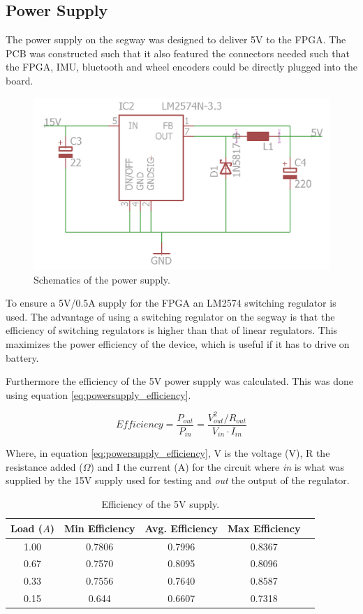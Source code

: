 
\subsection{Power Supply}

The power supply on the segway was designed to deliver 5V to the FPGA.
The PCB was constructed such that it also featured the connectors needed such that the FPGA, IMU, bluetooth and wheel encoders could be directly plugged into the board.


\begin{figure}[H]
\centering 
\includegraphics[width = 0.5 \textwidth]{images/powersupply}
\caption{Schematics of the power supply.}
\label{fig:powersupply_schematics}
\end{figure}

To ensure a 5V/0.5A supply for the FPGA an LM2574 switching regulator is used. 
The advantage of using a switching regulator on the segway is that the efficiency of switching regulators is higher than that of linear regulators.
This maximizes the power efficiency of the device, which is useful if it has to drive on battery.

Furthermore the efficiency of the 5V power supply was calculated.
This was done using equation \ref{eq:powersupply_efficiency}.

\begin{equation}
Efficiency = \frac{P_{out}}{P_{in}} = \frac{V_{out}^2 / R_{out}}{V_{in} \cdot I_{in}}
\label{eq:powersupply_efficiency}
\end{equation}

Where, in equation \ref{eq:powersupply_efficiency}, V is the voltage (V), R the resistance added ($\Omega$) and I the current (A) for the circuit where \textit{in} is what was supplied by the 15V supply used for testing and \textit{out} the output of the regulator.


\begin{table}[H]
\centering
\begin{tabular}{|c|c|c|c|c|}
\hline
Load ($A$) & Min Efficiency & Avg. Efficiency & Max Efficiency \\ \hline
1.00 & 0.7806 & 0.7996 & 0.8367 \\ \hline
0.67 & 0.7570 & 0.8095 & 0.8096 \\ \hline
0.33 & 0.7556 & 0.7640 & 0.8587 \\ \hline
0.15 & 0.644 & 0.6607 & 0.7318 \\ \hline
\end{tabular}
\caption{Efficiency of the 5V supply.}
\label{tab:voltageefficiency}
\end{table}

